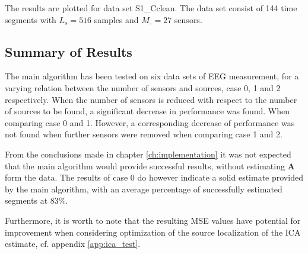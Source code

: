 The results are plotted for data set S1\_Cclean. 
The data set consist of 144 time segments with $L_s = 516$ samples and $M\_ = 27$ sensors. 
 
\subsection{Summary of Results}
The main algorithm has been tested on six data sets of EEG measurement, for a varying relation between the number of sensors and sources, case 0, 1 and 2 respectively.
When the number of sensors is reduced with respect to the number of sources to be found, a significant decrease in performance was found. When comparing case 0 and 1. 
However, a corresponding decrease of performance was not found when further sensors were removed when comparing case 1 and 2. 

From the conclusions made in chapter \ref{ch:implementation} it was not expected that the main algorithm would provide successful results, without estimating $\mathbf{A}$ form the data. 
The results of case 0 do however indicate a solid estimate provided by the main algorithm, with an average percentage of successfully estimated segments at $83\%$. 

Furthermore, it is worth to note that the resulting MSE values have potential for improvement when considering optimization of the source localization of the ICA estimate, cf. appendix \ref{app:ica_test}.




